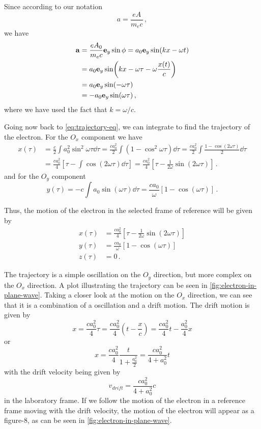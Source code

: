 \documentclass[12pt, class=report, crop=false]{standalone}
\begin{document}
Since according to our notation
\[
a=\frac{e A}{m_e c}\,,
\]
we have
\[
\begin{aligned}
  \vb{a} &= \frac{e A_0}{m_e c}\vb{e}_y\sin{\phi} =
  a_0 \vb{e}_y \sin(kx -\omega t)\\ &=
  a_0 \vb{e}_y \sin(kx - \omega\tau - \omega\frac{x(t)}{c}) \\ &=
  a_0 \vb{e}_y \sin(-\omega \tau) \\ &=
 -a_0 \vb{e}_y \sin(\omega\tau)\,,
\end{aligned}
\]
where we have used the fact that \(k=\omega/c\).

Going now back to \cref{eq:trajectory-eq}, we can integrate to find the trajectory
of the electron. For the \(O_x\) component we have
\[
\begin{aligned}
  x(\tau) &= \frac{c}{2}\int a_0^2 \sin^2 \omega\tau \dd{\tau} =
  \frac{c a_0^2}{2}\int \left(1-\cos^2\omega\tau\right)\dd{\tau} =
  \frac{c a_0^2}{2}\int \frac{1-\cos(2\omega\tau)}{2}\dd{\tau} \\&=
  \frac{c a_0^2}{4}\left[\tau - \int \cos(2\omega\tau)\dd{\tau}\right] =
  \frac{c a_0^2}{4}\left[\tau - \frac{1}{2\omega}\sin(2\omega\tau)\right]\,.
\end{aligned}
\]
and for the \(O_y\) component
\[
y(\tau) = -c \int a_0 \sin(\omega\tau)\dd{\tau} = \frac{c a_0}{\omega}
\left[1 - \cos(\omega\tau)\right]\,.
\]

Thus, the motion of the electron in the selected frame of reference will be
given by
\[
\begin{aligned}
  x(\tau) &= \frac{c a_0^2}{4}\left[\tau - \frac{1}{2\omega}\sin(2\omega\tau)\right]\\
  y(\tau) &= \frac{c a_0}{\omega} \left[1 - \cos(\omega\tau)\right]\\
  z(\tau) &= 0\,.
\end{aligned}
\]

The trajectory is a simple oscillation on the \(O_y\) direction, but more complex
on the \(O_x\) direction. A plot illustrating the trajectory can be seen
in \cref{fig:electron-in-plane-wave}. Taking a closer look at the motion on the
\(O_x\) direction, we can see that it is a combination of a oscillation and
a drift motion. The drift motion is given by
\[
x = \frac{c a_0^2}{4} \tau = \frac{c a_0^2}{4} (t - \frac{x}{c}) =
\frac{c a_0^2}{4}t - \frac{a_0^2}{4}x
\]
or
\[
x = \frac{c a_0^2}{4} \frac{t}{1+\frac{a_0^2}{2}} = \frac{c a_0^2}{4+a_0^2}t
\]
with the drift velocity being given by
\[
v_{drift} = \frac{c a_0^2}{4+a_0^2}c
\]
in the laboratory frame. If we follow the motion of the electron in a reference
frame moving with the drift velocity, the motion of the electron will appear
as a figure-8, as can be seen in \cref{fig:electron-in-plane-wave}.
\end{document}
